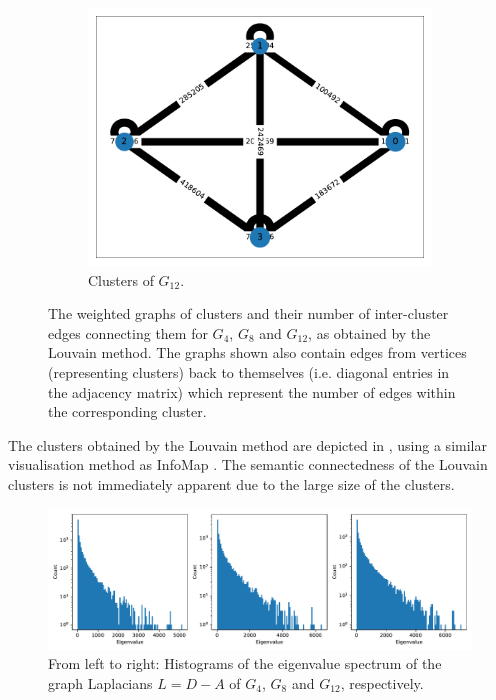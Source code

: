 \documentclass[12pt, a4paper]{article}
\begin{document}
\begin{figure}
\begin{subfigure}[b]{0.3\textwidth}
      \includegraphics[width=\textwidth]{figures/H-12-louvain.pdf}
      \caption{Clusters of $G_{12}$.}
      \label{fig:h-12}
    \end{subfigure}
    \caption{The weighted graphs of clusters and their number of inter-cluster edges connecting them for $G_4$, $G_8$ and $G_{12}$, as obtained by the Louvain method. The graphs shown also contain edges from vertices (representing clusters) back to themselves (i.e. diagonal entries in the adjacency matrix) which represent the number of edges within the corresponding cluster.}
    \label{fig:three graphs}
  \end{figure}

  The clusters obtained by the Louvain method are depicted in , using a similar visualisation method as InfoMap .
  The semantic connectedness of the Louvain clusters is not immediately apparent due to the large size of the clusters.

  \begin{figure}[H]
    \centering
    \includegraphics[width=\linewidth]{figures/spectrum-of-laplacian.pdf}
    \caption{From left to right: Histograms of the eigenvalue spectrum of the graph Laplacians $L = D - A$ of $G_4$, $G_8$ and $G_{12}$, respectively.}
    \label{fig:laplacians}
  \end{figure}
\end{document}
